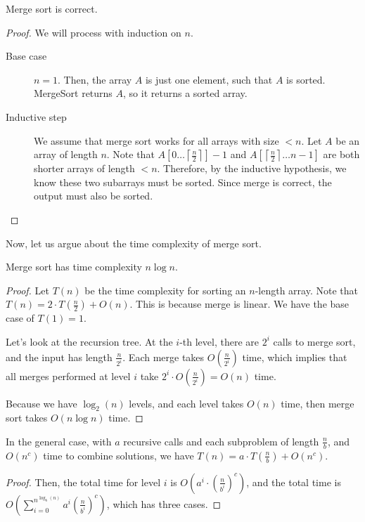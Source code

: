 \begin{theorem}
	Merge sort is correct.
\end{theorem}
\begin{proof}
	We will process with induction on \( n \).
	\begin{description}
		\item[Base case] \( n=1 \). Then, the array \( A \) is just one element, such that \( A \) is sorted. MergeSort returns \( A \), so it returns a sorted array.
		\item[Inductive step] We assume that merge sort works for all arrays with size \( < n \). Let \( A \) be an array of length \( n \). Note that \( A[0\ldots \left\lceil \frac{n}{2} \right\rceil ]-1 \) and \( A[\left\lceil \frac{n}{2} \right\rceil \ldots n-1] \) are both shorter arrays of length \( <n \). Therefore, by the inductive hypothesis, we know these two subarrays must be sorted. Since merge is correct, the output must also be sorted.
	\end{description}
\end{proof}

Now, let us argue about the time complexity of merge sort.

\begin{theorem}
	Merge sort has time complexity \( n\log n \).
\end{theorem}
\begin{proof}
	Let \( T(n) \) be the time complexity for sorting an \( n \)-length array. Note that \( T(n)=2\cdot T(\frac{n}{2}) + O(n) \). This is because merge is linear. We have the base case of \( T(1)=1 \). 

	Let's look at the recursion tree. At the \( i \)-th level, there are \( 2^i \) calls to merge sort, and the input has length \( \frac{n}{2^i} \). Each merge takes \( O(\frac{n}{2^i}) \) time, which implies that all merges performed at level \( i \) take \( 2^i \cdot O(\frac{n}{2^i}) = O(n)\) time.

	Because we have \( \log_2(n) \) levels, and each level takes \( O(n) \) time, then merge sort takes \( O(n\log n) \) time.
\end{proof}

\begin{theorem}
	In the general case, with \( a \) recursive calls and each subproblem of length \( \frac{n}{b} \), and \( O(n^c) \) time to combine solutions, we have \( T(n) = a \cdot T(\frac{n}{b}) + O(n^c) \).
\end{theorem}
\begin{proof}
	Then, the total time for level \( i \) is \( O(a^i \cdot \left(\frac{n}{b^i}\right)^c) \), and the total time is \( O(\sum_{i=0}^{n^{\log_b(n)}} a^i \left( \frac{n}{b^i} \right)^c ) \), which has three cases.
\end{proof}
